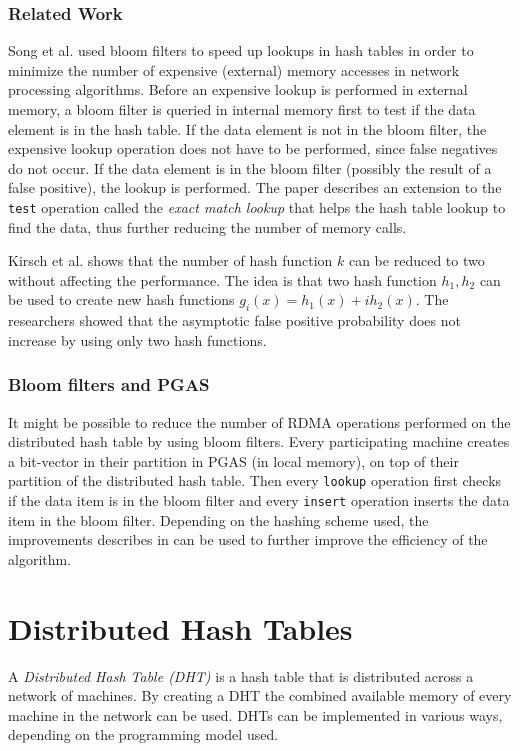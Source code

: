 \subsubsection{Related Work}
Song et al. \cite{song2005fast} used bloom filters to speed up lookups in hash tables in order to minimize the number of expensive (external) memory accesses in network processing algorithms. Before an expensive lookup is performed in external memory, a bloom filter is queried in internal memory first to test if the data element is in the hash table. If the data element is not in the bloom filter, the expensive lookup operation does not have to be performed, since false negatives do not occur. If the data element is in the bloom filter (possibly the result of a false positive), the lookup is performed. The paper describes an extension to the \texttt{test} operation called the \emph{exact match lookup} that helps the hash table lookup to find the data, thus further reducing the number of memory calls. 

Kirsch et al. \cite{kirsch2006less} shows that the number of hash function $k$ can be reduced to two without affecting the performance. The idea is that two hash function $h_1, h_2$ can be used to create new hash functions $g_i(x) = h_1(x) + ih_2(x)$. The researchers showed that the asymptotic false positive probability does not increase by using only two hash functions.

\subsubsection{Bloom filters and PGAS}
It might be possible to reduce the number of RDMA operations performed on the distributed hash table by using bloom filters. Every participating machine creates a bit-vector in their partition in PGAS (in local memory), on top of their partition of the distributed hash table. Then every \texttt{lookup} operation first checks if the data item is in the bloom filter and every \texttt{insert} operation inserts the data item in the bloom filter. Depending on the hashing scheme used, the improvements describes in \cite{song2005fast, kirsch2006less} can be used to further improve the efficiency of the algorithm.

\section{Distributed Hash Tables}
A \emph{Distributed Hash Table (DHT)} is a hash table that is distributed across a network of machines. By creating a DHT the combined available memory of every machine in the network can be used. DHTs can be implemented in various ways, depending on the programming model used.

